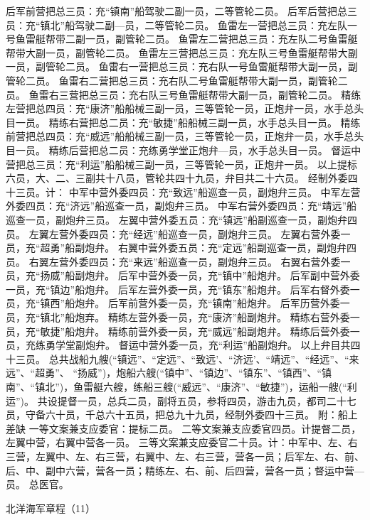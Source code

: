 \documentclass[12pt,UTF8]{ctexbook}
\begin{document}
后军前营把总三员：充“镇南”船驾驶二副一员，二等管轮二员。
后军后营把总三员：充“镇北”船驾驶二副—员，二等管轮二员。
鱼雷左一营把总三员：充左队一号鱼雷艇帮带二副一员，副管轮二员。
鱼雷左二营把总三员：充左队二号鱼雷艇帮带大副一员，副管轮二员。
鱼雷左三营把总三员：充左队三号鱼雷艇帮带大副一员，副管轮二员。
鱼雷右一营把总三员：充右队一号鱼雷艇帮带大副一员，副管轮二员。
鱼雷右二营把总三员：充右队二号鱼雷艇帮带大副一员，副管轮二员。
鱼雷右三营把总三员：充右队三号鱼雷艇帮带大副一员，副管轮二员。
精练左营把总四员：充“康济”船船械三副一员，三等管轮一员，正炮弁一员，水手总头目一员。
精练右营把总二员：充“敏捷”船船械三副一员，水手总头目一员。
精练前营把总四员：充“威远”船船械三副一员，三等管轮一员，正炮弁一员，水手总头目一员。
精练后营把总二员：充练勇学堂正炮弁—员，水手总头目一员。
督运中营把总三员：充“利运”船船械三副一员，三等管轮一员，正炮弁一员。
以上提标六员，大、二、三副共十八员，管轮共四十九员，弁目共二十六员。
经制外委四十三员。计：
中军中营外委四员：充“致远”船巡查一员，副炮弁三员。
中军左营外委四员：充“济远”船巡查一员，副炮弁三员。
中军右营外委四员：充“靖远”船巡查一员，副炮弁三员。
左翼中营外委五员：充“镇远”船副巡查一员，副炮弁四员。
左翼左营外委四员：充“经远”船巡查一员，副炮弁三员。
左翼右营外委一员，充“超勇”船副炮弁。
右翼中营外委五员：充“定远”船副巡查一员，副炮弁四员。
右翼左营外委四员：充“来远”船巡查一员，副炮弁三员。
右翼右营外委一员，充“扬威”船副炮弁。
后军中营外委一员，充“镇中”船炮弁。
后军副中营外委一员，充“镇边”船炮弁。
后军左营外委一员，充“镇东”船炮弁。
后军右督外委一员，充“镇西”船炮弁。
后军前营外委一员，充“镇南”船炮弁。
后军历营外委一员，充“镇北”船炮弃。
精练左营外委一员，充“康济”船副炮弁。
精练右营外委一员，充“敏捷”船炮弁。
精练前营外委一员，充“威远”船副炮弁。
精练后营外委一员，充练勇学堂副炮弁。
督运中营外委一员，充“利运”船副炮弁。
以上弁目共四十三员。
总共战船九艘(“镇远”、“定远”、“致远’、“济远’、“靖远”、“经远”、“来远”、“超勇”、 “扬威”)，炮船六艘(“镇中”、“镇边”、“镇东”、“镇西”、“镇南”、“镇北”)，鱼雷艇六艘，练船三艘(“威远”、“康济”、“敏捷”)，运船一艘(“利运”)。
共设提督一员，总兵二员，副将五员，参将四员，游击九员，都司二十七员，守备六十员，千总六十五员，把总九十九员，经制外委四十三员。
附：船上差缺
一等文案兼支应委官：提标二员。
二等文案兼支应委官四员。计提督二员，左翼中营，右翼中营各一员。
三等文案兼支应委官二十员。计：中军中、左、右三营，左翼中、左、右三营，右翼中、左、右三营，营各一员；后军左、右、前、后、中、副中六营，营各一员；精练左、右、前、后四营，营各一员；督运中营—员。
总医官。




北洋海军章程（11）
\end{document}
